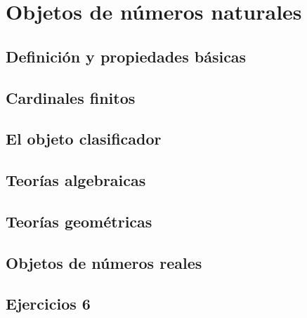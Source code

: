 \chapter{Objetos de números naturales}
\label{chap:6}

\section{Definición y propiedades básicas}
\label{sec:6.1}

\section{Cardinales finitos}
\label{sec:6.2}

\section{El objeto clasificador}
\label{sec:6.3}

\section{Teorías algebraicas}
\label{sec:6.4}

\section{Teorías geométricas}
\label{sec:6.5}

\section{Objetos de números reales}
\label{sec:6.6}

\section*{Ejercicios 6}
\label{sec:ejercicios-6}

